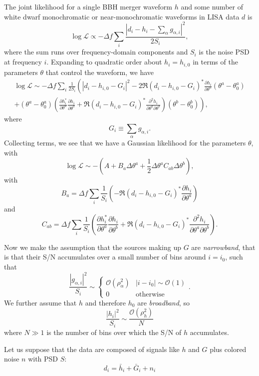\documentclass[modern]{aastex631}
\newcommand{\like}{\mathcal{L}}
\newcommand{\order}[1]{\mathcal{O}\left( #1 \right)}
\begin{document}
The joint likelihood for a single BBH merger waveform $h$ and some number of
white dwarf monochromatic or near-monochromatic waveforms in LISA data $d$ is
%
\begin{equation}
    \log \like \propto - \Delta f \sum_i \frac{\left| d_i - h_i - \sum_\alpha g_{\alpha, i} \right|^2}{2 S_i},
\end{equation}
%
where the sum runs over frequency-domain components and $S_i$ is the noise PSD
at frequency $i$.  Expanding to quadratic order about $h_i = h_{i,0}$ in terms
of the parameters $\theta$ that control the waveform, we have
%
\begin{multline}
    \log \like \sim - \Delta f \sum_i \frac{1}{2 S_i} \left( \left| d_i - h_{i,0} - G_i \right|^2 - 2 \Re \left( d_i - h_{i,0} - G_i \right)^* \frac{\partial h_i}{\partial \theta^a} \left( \theta^a - \theta^a_0 \right)  \right. \\ \left. + \left(\theta^a - \theta_0^a \right) \left( \frac{\partial h_i^*}{\partial \theta^a} \frac{\partial h_i}{\partial \theta^b} + \Re \left( d_i - h_{i,0} - G_i \right)^* \frac{\partial^2 h_i}{\partial \theta^a \partial \theta^b} \right) \left( \theta^b - \theta_0^b \right) \right),
\end{multline}
%
where
%
\begin{equation}
    G_i \equiv \sum_\alpha g_{\alpha,i}.
\end{equation}
%
Collecting terms, we see that we have a Gaussian likelihood for the parameters
$\theta$, with
%
\begin{equation}
    \log \like \sim - \left( A + B_a \Delta \theta^a + \frac{1}{2} \Delta \theta^a C_{ab} \Delta \theta^b \right),
\end{equation}
%
with
%
\begin{equation}
    B_a = \Delta f \sum_i \frac{1}{S_i} \left( - \Re \left( d_i - h_{i,0} - G_i \right)^* \frac{\partial h_i}{\partial \theta^a} \right)
\end{equation}
%
and
%
\begin{equation}
    C_{ab} = \Delta f \sum_i \frac{1}{S_i} \left( \frac{\partial h_i^*}{\partial \theta^a} \frac{\partial h_i}{\partial \theta^b} + \Re \left( d_i - h_{i,0} - G_i \right)^* \frac{\partial^2 h_i}{\partial \theta^a \partial \theta^b} \right).
\end{equation}
%

Now we make the assumption that the sources making up $G$ are \emph{narrowband},
that is that their S/N accumulates over a small number of bins around $i = i_0$,
such that
%
\begin{equation}
\frac{\left| g_{\alpha,i} \right|^2}{S_i} \sim \begin{cases}
    \order{\rho_\alpha^2} & \left| i - i_0 \right| \sim \order{1} \\
    0 & \mathrm{otherwise}
\end{cases}.
\end{equation}
%
We further assume that $h$ and therefore $h_0$ are \emph{broadband}, so
%
\begin{equation}
\frac{\left| h_i \right|^2}{S_i} \sim \frac{\order{\rho_h^2}}{N}
\end{equation}
%
where $N \gg 1$ is the number of bins over which the S/N of $h$ accumulates.

Let us suppose that the data are composed of signals like $h$ and $G$ plus colored noise $n$ with PSD $S$:
%
\begin{equation}
    d_i = \bar{h}_i + \bar{G}_i + n_i
\end{equation}
%
\end{document}

